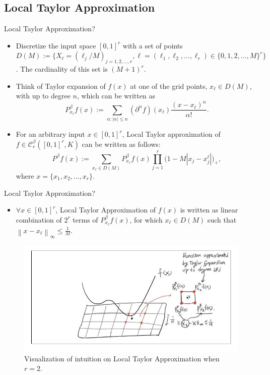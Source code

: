\documentclass{if-beamer}
\begin{document}
\subsection{Local Taylor Approximation}
\begin{frame}{Local Taylor Approximation?}
    \begin{itemize}
      \item Discretize the input space $[0,1]^{r}$ with a set of points     $D(M):=\{X_{\ell}=(\ell_{j}/M)_{j=1,2,\dots,r},\ell=(\ell_{1},\ell_{2},\dots,\ell_{r}) \in\{0,1,2,\dots,M\}^{r}\}$. The cardinality of this set is $(M+1)^{r}$.
      \item Think of Taylor expansion of $f(x)$ at one of the grid points, $x_{\ell}\in D(M)$, with up to degree $n$, which can be written as 
    \begin{equation*}
        P_{x_{\ell}}^{\beta}f(x):=\sum_{\alpha:|\alpha|\leq n}(\partial^{\alpha}f)(x_{\ell})\frac{(x-x_{\ell})^{\alpha}}{\alpha!}.
    \end{equation*}
      \item For an arbitrary input $x\in[0,1]^{r}$, Local Taylor approximation of $f\in \mathcal{C}_{r}^{\beta}([0,1]^{r},K)$ can be written as follows:
    \begin{equation*}
        P^{\beta}f(x):=\sum_{x_{\ell}\in D(M)}P_{x_{\ell}}^{\beta}f(x)\prod_{j=1}^{r}\bigg( 1- M|x_{j}-x_{j}^{\ell}| \bigg)_{+},
    \end{equation*}
    where $x=\{x_{1},x_{2},\dots,x_{r}\}$.
    \end{itemize}
\end{frame}

\begin{frame}{Local Taylor Approximation?}
    \begin{itemize}
        \item $\forall x \in [0,1]^{r}$, Local Taylor Approximation of $f(x)$ is written as linear combination of $2^{r}$ terms of $P^{\beta}_{x_{\ell}}f(x)$, for which $x_{\ell}\in D(M)$ such that $\left\| x - x_{\ell} \right\|_{\infty}\leq \frac{1}{M}$.
    \end{itemize}
    \begin{figure}[htbp]
        \includegraphics[width=1\textwidth]{LTA.png}
        \caption{ Visualization of intuition on Local Taylor Approximation when $r=2$.}
        \label{fig:figure1}
    \end{figure}
\end{frame}
\end{document}
